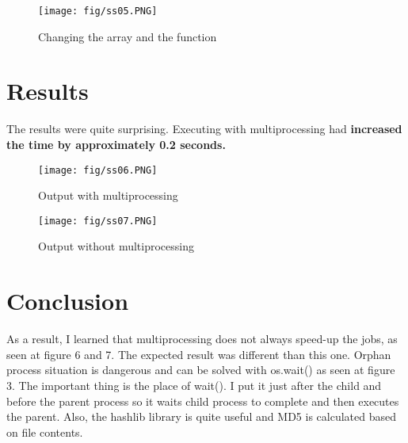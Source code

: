 \documentclass[onecolumn]{article}
\begin{document}
\begin{figure}[H]
\centering
\texttt{[image: fig/ss05.PNG]}
\caption{Changing the array and the function}
\end{figure}


\section{Results}
The results were quite surprising. Executing with multiprocessing had \textbf{increased the time by approximately 0.2 seconds.} 

\begin{figure}[H]
\centering
\texttt{[image: fig/ss06.PNG]}
\caption{Output with multiprocessing}
\end{figure}

\begin{figure}[H]
\centering
\texttt{[image: fig/ss07.PNG]}
\caption{Output without multiprocessing}
\end{figure}


\section{Conclusion}
As a result, I learned that multiprocessing does not always speed-up the jobs, as seen at figure 6 and 7. The expected result was different than this one.  Orphan process situation is dangerous and can be solved with os.wait() as seen at figure 3. The important thing is the place of wait(). I put it just after the child and before the parent process so it waits child process to complete and then executes the parent. Also, the hashlib library is quite useful and MD5 is calculated based on file contents.
\end{document}
